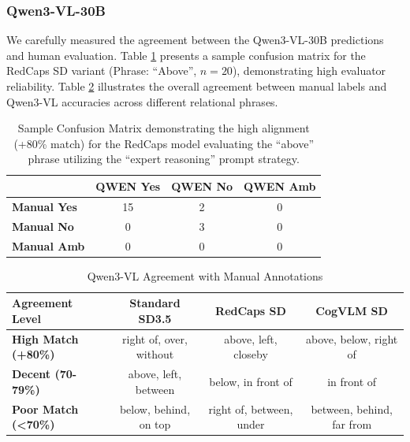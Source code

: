 \subsubsection{Qwen3-VL-30B}
We carefully measured the agreement between the Qwen3-VL-30B predictions and human evaluation. Table \ref{tab:redcaps_cm} presents a sample confusion matrix for the RedCaps SD variant (Phrase: ``Above'', $n=20$), demonstrating high evaluator reliability. Table \ref{tab:vlm_agreement} illustrates the overall agreement between manual labels and Qwen3-VL accuracies across different relational phrases.

\begin{table}[ht]
\caption{Sample Confusion Matrix demonstrating the high alignment (+80\% match) for the RedCaps model evaluating the ``above'' phrase utilizing the ``expert reasoning'' prompt strategy.}
\label{tab:redcaps_cm}
\begin{center}
\begin{small}
\begin{tabular}{lccc}
\toprule
 & \textbf{QWEN Yes} & \textbf{QWEN No} & \textbf{QWEN Amb} \\
\midrule
\textbf{Manual Yes} & 15 & 2 & 0 \\
\textbf{Manual No} & 0 & 3 & 0 \\
\textbf{Manual Amb} & 0 & 0 & 0 \\
\bottomrule
\end{tabular}
\end{small}
\end{center}
\end{table}

\begin{table}[ht]
\caption{Qwen3-VL Agreement with Manual Annotations}
\label{tab:vlm_agreement}
\begin{center}
\begin{small}
\begin{tabular}{lccc}
\toprule
\textbf{Agreement Level} & \textbf{Standard SD3.5} & \textbf{RedCaps SD} & \textbf{CogVLM SD} \\
\midrule
\textbf{High Match (+80\%)} & right of, over, without & above, left, closeby & above, below, right of \\
\textbf{Decent (70-79\%)}    & above, left, between    & below, in front of    & in front of \\
\textbf{Poor Match (<70\%)}  & below, behind, on top   & right of, between, under & between, behind, far from \\
\bottomrule
\end{tabular}
\end{small}
\end{center}
\end{table}

